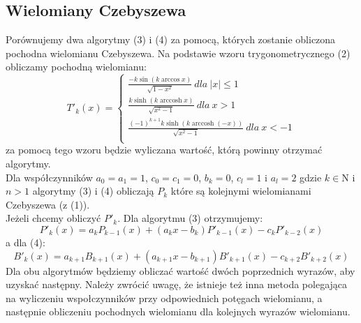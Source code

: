\documentclass{article}
\DeclareMathOperator{\arccosh}{arccosh}
\begin{document}
\subsection{Wielomiany Czebyszewa}
Porównujemy dwa algorytmy (3) i (4) za pomocą, których zostanie obliczona pochodna wielomianu Czebyszewa. Na podstawie wzoru trygonometrycznego (2) obliczamy pochodną wielomianu:
\begin{equation} 
    T'_{k}(x)=\left\{
                \begin{array}{ll}
                  \frac{-k \sin(k \arccos x)}{\sqrt{1-x^2}} \ dla \  |x| \leqslant 1\\
                  \frac{k \sinh(k \arccosh x)}{\sqrt{x^2-1}} \ dla \  x > 1\\
                  \frac{(-1)^{k+1}k \sinh(k \arccosh (-x))}{\sqrt{x^2-1}} \ dla \  x < -1\\
                \end{array}
              \right.
\end{equation}
za pomocą tego wzoru będzie wyliczana wartość, którą powinny otrzymać algorytmy.\\
Dla współczynników $a_0=a_1=1$, $c_0=c_1=0$, $b_k=0$, $c_l=1$ i $a_l=2$ gdzie $k\in \mathrm{N}$ i $n>1$ algorytmy (3) i (4) obliczają $P_k$ które są kolejnymi wielomianami Czebyszewa (z (1)).\\ Jeżeli chcemy obliczyć $P'_k$. Dla algorytmu (3) otrzymujemy:
\begin{equation} 
    P'_{k}(x) = a_{k}P_{k-1}(x) + (a_{k}x - b_{k})P'_{k-1}(x) - c_{k}P'_{k-2}(x)
\end{equation}
a dla (4):
\begin{equation} 
    B'_{k}(x) = a_{k+1}B_{k+1}(x) + (a_{k+1}x - b_{k+1})B'_{k+1}(x) - c_{k+2}B'_{k+2}(x)
\end{equation}
Dla obu algorytmów będziemy obliczać wartość dwóch poprzednich wyrazów, aby uzyskać następny. Należy zwrócić uwagę, że istnieje też inna metoda polegająca na wyliczeniu wspołczynników przy odpowiednich potęgach wielomianu, a następnie obliczeniu pochodnych wielomianu dla kolejnych wyrazów wielomianu.
\end{document}
